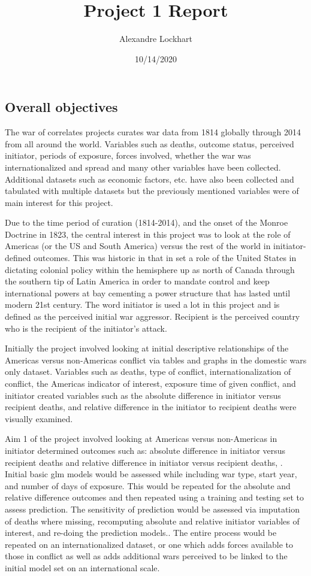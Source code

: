 \documentclass[
]{article}
\title{Project 1 Report}
\author{Alexandre Lockhart}
\date{10/14/2020}
\begin{document}
\maketitle

\hypertarget{overall-objectives}{%
\subsection{Overall objectives}\label{overall-objectives}}

The war of correlates projects curates war data from 1814 globally
through 2014 from all around the world. Variables such as deaths,
outcome status, perceived initiator, periods of exposure, forces
involved, whether the war was internationalized and spread and many
other variables have been collected. Additional datasets such as
economic factors, etc. have also been collected and tabulated with
multiple datasets but the previously mentioned variables were of main
interest for this project.

Due to the time period of curation (1814-2014), and the onset of the
Monroe Doctrine in 1823, the central interest in this project was to
look at the role of Americas (or the US and South America) versus the
rest of the world in initiator-defined outcomes. This was historic in
that in set a role of the United States in dictating colonial policy
within the hemisphere up as north of Canada through the southern tip of
Latin America in order to mandate control and keep international powers
at bay cementing a power structure that has lasted until modern 21st
century. The word initiator is used a lot in this project and is defined
as the perceived initial war aggressor. Recipient is the perceived
country who is the recipient of the initiator's attack.

Initially the project involved looking at initial descriptive
relationships of the Americas versus non-Americas conflict via tables
and graphs in the domestic wars only dataset. Variables such as deaths,
type of conflict, internationalization of conflict, the Americas
indicator of interest, exposure time of given conflict, and initiator
created variables such as the absolute difference in initiator versus
recipient deaths, and relative difference in the initiator to recipient
deaths were visually examined.

Aim 1 of the project involved looking at Americas versus non-Americas in
initiator determined outcomes such as: absolute difference in initiator
versus recipient deaths and relative difference in initiator versus
recipient deaths, . Initial basic glm models would be assessed while
including war type, start year, and number of days of exposure. This
would be repeated for the absolute and relative difference outcomes and
then repeated using a training and testing set to assess prediction. The
sensitivity of prediction would be assessed via imputation of deaths
where missing, recomputing absolute and relative initiator variables of
interest, and re-doing the prediction models.. The entire process would
be repeated on an internationalized dataset, or one which adds forces
available to those in conflict as well as adds additional wars perceived
to be linked to the initial model set on an international scale.
\end{document}
